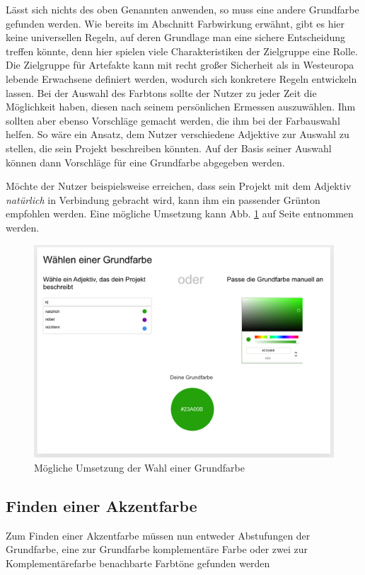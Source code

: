 Lässt sich nichts des oben Genannten anwenden, so muss eine andere Grundfarbe gefunden werden. Wie bereits im Abschnitt Farbwirkung erwähnt, gibt es hier keine universellen Regeln, auf deren Grundlage man eine sichere Entscheidung treffen könnte, denn hier spielen viele Charakteristiken der Zielgruppe eine Rolle. Die Zielgruppe für Artefakte kann mit recht großer Sicherheit als in Westeuropa lebende Erwachsene definiert werden, wodurch sich konkretere Regeln entwickeln lassen.
Bei der Auswahl des Farbtons sollte der Nutzer zu jeder Zeit die Möglichkeit haben, diesen nach seinem persönlichen Ermessen auszuwählen. Ihm sollten aber ebenso Vorschläge gemacht werden, die ihm bei der Farbauswahl helfen. So wäre ein Ansatz, dem Nutzer verschiedene Adjektive zur Auswahl zu stellen, die sein Projekt beschreiben könnten. Auf der Basis seiner Auswahl können dann Vorschläge für eine Grundfarbe abgegeben werden.

Möchte der Nutzer beispielsweise erreichen, dass sein Projekt mit dem Adjektiv \textit{natürlich} in Verbindung gebracht wird, kann ihm ein passender Grünton empfohlen werden. Eine mögliche Umsetzung kann Abb. \ref{fig:wire-base-color} auf Seite \pageref{fig:wire-base-color} entnommen werden.

\begin{figure}[h]
    \centering
    \includegraphics[width=1\textwidth]{images/wireframe-base-color.png}
    \caption{Mögliche Umsetzung der Wahl einer Grundfarbe}
    \label{fig:wire-base-color}
\end{figure}

\subsection{Finden einer Akzentfarbe}
Zum Finden einer Akzentfarbe müssen nun entweder Abstufungen der Grundfarbe, eine zur Grundfarbe komplementäre Farbe oder zwei zur Komplementärefarbe benachbarte Farbtöne gefunden werden

